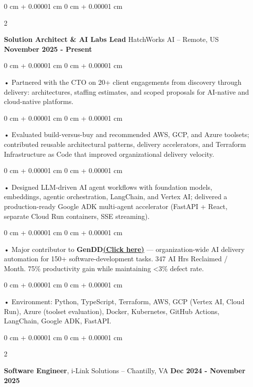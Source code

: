 \documentclass[10pt, letterpaper]{article}
\newenvironment{onecolentry}{
    \begin{adjustwidth}{
        0 cm + 0.00001 cm
    }{
        0 cm + 0.00001 cm
    }
}{
    \end{adjustwidth}
} %
\newenvironment{twocolentry}[2][]{
    \onecolentry
    \def\secondColumn{#2}
    \setcolumnwidth{\fill, 4.5 cm}
    \begin{paracol}{2}
}{
    \switchcolumn \raggedleft \secondColumn
    \end{paracol}
    \endonecolentry
} %
\begin{document}
        \begin{twocolentry}{
            \textbf{November 2025 - Present}
        }
            \textbf{Solution Architect \& AI Labs Lead} HatchWorks AI -- Remote, US\end{twocolentry}

        \begin{onecolentry}
             • Partnered with the CTO on 20+ client engagements from discovery through delivery: architectures, staffing estimates, and scoped proposals for AI-native and cloud-native platforms.
        \end{onecolentry}
        \begin{onecolentry}
             • Evaluated build-versus-buy and recommended AWS, GCP, and Azure toolsets; contributed reusable architectural patterns, delivery accelerators, and Terraform Infrastructure as Code that improved organizational delivery velocity.
        \end{onecolentry}
        \begin{onecolentry}
             • Designed LLM-driven AI agent workflows with foundation models, embeddings, agentic orchestration, LangChain, and Vertex AI; delivered a production-ready Google ADK multi-agent accelerator (FastAPI + React, separate Cloud Run containers, SSE streaming).
        \end{onecolentry}
        \begin{onecolentry}
             • Major contributor to \textbf{GenDD}\href{https://hatchworks.com/generative-driven-development/}{\textbf{(Click here)}} --- organization-wide AI delivery automation for 150+ software-development tasks. 347 AI Hrs Reclaimed / Month. 75\% productivity gain while maintaining {<}3\% defect rate.
        \end{onecolentry}
        \begin{onecolentry}
             • Environment: Python, TypeScript, Terraform, AWS, GCP (Vertex AI, Cloud Run), Azure (toolset evaluation), Docker, Kubernetes, GitHub Actions, LangChain, Google ADK, FastAPI.
        \end{onecolentry}

        \vspace{0.1cm}

        \begin{twocolentry}{
            \textbf{Dec 2024 - November 2025}
        }
            \textbf{Software Engineer}, i-Link Solutions -- Chantilly, VA\end{twocolentry}
\end{document}
